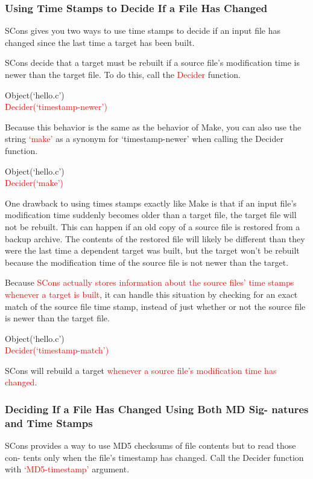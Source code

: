 \documentclass[12pt,a4paper]{article}
\begin{document}
\subsubsection{Using Time Stamps to Decide If a File Has Changed}

SCons gives you two ways to use time stamps to decide if an input file has changed since the last time a target has been built.

SCons decide that a target must be rebuilt if a source file's modification time is newer than the target file. To do this, call the \textcolor{red}{Decider} function.

Object(`hello.c') \\
\textcolor{red}{Decider(`timestamp-newer')}

Because this behavior is the same as the behavior of Make, you can also use the string \textcolor{red}{`make'} as a synonym for `timestamp-newer' when calling the Decider function.

Object(`hello.c') \\
\textcolor{red}{Decider(`make')}

One drawback to using times stamps exactly like Make is that if an input file's modification time suddenly becomes older than a target file, the target file will not be rebuilt. This can happen if an old copy of a source file is restored from a backup archive. The contents of the restored file will likely be different than they were the last time a dependent target was built, but the target won't be rebuilt because the modification time of the source file is not newer than the target.

Because \textcolor{red}{SCons actually stores information about the source files' time stamps whenever a target is built}, it can handle this situation by checking for an exact match of the source file time stamp, instead of just whether or not the source file is newer than the target file. 

Object(`hello.c') \\
\textcolor{red}{Decider(`timestamp-match')}

SCons will rebuild a target \textcolor{red}{whenever a source file's modification time has changed}.

\subsubsection{Deciding If a File Has Changed Using Both MD Sig- natures and Time Stamps}
SCons provides a way to use MD5 checksums of file contents but to read those con- tents only when the file's timestamp has changed. Call the Decider function with \textcolor{red}{`MD5-timestamp'} argument.
\end{document}
